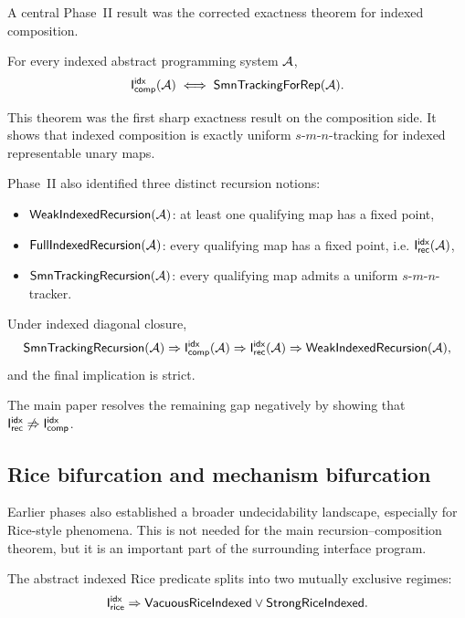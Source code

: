 \documentclass[11pt]{article}
\begin{document}
A central Phase~II result was the corrected exactness theorem for indexed composition.

\begin{theorem}\label{thm:app-corrected-exactness}
For every indexed abstract programming system \(\mathcal{A}\),
\[
\mathsf{I}_{\mathsf{comp}}^{\mathsf{idx}}(\mathcal{A})
\;\Longleftrightarrow\;
\mathsf{SmnTrackingForRep}(\mathcal{A}).
\]
\end{theorem}

This theorem was the first sharp exactness result on the composition side.  It shows that indexed composition is exactly uniform \(s\)-\(m\)-\(n\)-tracking for indexed representable unary maps.

Phase~II also identified three distinct recursion notions:

\begin{itemize}[leftmargin=2em]
\item \(\mathsf{WeakIndexedRecursion}(\mathcal{A})\): at least one qualifying map has a fixed point,
\item \(\mathsf{FullIndexedRecursion}(\mathcal{A})\): every qualifying map has a fixed point, i.e. \(\mathsf{I}_{\mathsf{rec}}^{\mathsf{idx}}(\mathcal{A})\),
\item \(\mathsf{SmnTrackingRecursion}(\mathcal{A})\): every qualifying map admits a uniform \(s\)-\(m\)-\(n\)-tracker.
\end{itemize}

\begin{theorem}\label{thm:app-rec-taxonomy}
Under indexed diagonal closure,
\[
\mathsf{SmnTrackingRecursion}(\mathcal{A})\Rightarrow \mathsf{I}_{\mathsf{comp}}^{\mathsf{idx}}(\mathcal{A})\Rightarrow \mathsf{I}_{\mathsf{rec}}^{\mathsf{idx}}(\mathcal{A})\Rightarrow \mathsf{WeakIndexedRecursion}(\mathcal{A}),
\]
and the final implication is strict.
\end{theorem}

The main paper resolves the remaining gap negatively by showing that \(\mathsf{I}_{\mathsf{rec}}^{\mathsf{idx}}\not\Rightarrow \mathsf{I}_{\mathsf{comp}}^{\mathsf{idx}}\).

\subsection{Rice bifurcation and mechanism bifurcation}\label{app:rice}

Earlier phases also established a broader undecidability landscape, especially for Rice-style phenomena.  This is not needed for the main recursion--composition theorem, but it is an important part of the surrounding interface program.

\begin{theorem}\label{thm:app-rice-bifurcation}
The abstract indexed Rice predicate splits into two mutually exclusive regimes:
\[
\mathsf{I}_{\mathsf{rice}}^{\mathsf{idx}} \Rightarrow \mathsf{VacuousRiceIndexed} \lor \mathsf{StrongRiceIndexed}.
\]
\end{theorem}
\end{document}
